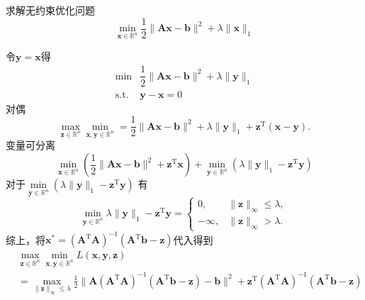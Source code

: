\begin{example}
    求解无约束优化问题
    \[
        \min_{\boldsymbol{x}\in\mathbb{R}^n}\frac12\|\boldsymbol{A}\boldsymbol{x}-\boldsymbol{b}\|^2+\lambda\|\boldsymbol{x}\|_1
    \]
    \begin{solution}
        令$\boldsymbol{y} = \boldsymbol{x}$得
        \[
            \begin{array}{rl}
                \min&\dfrac{1}{2}\|\boldsymbol{A}\boldsymbol{x}-\boldsymbol{b}\|^2+\lambda\|\boldsymbol{y}\|_1\\
                \mathrm{s.t.}&\boldsymbol{y}-\boldsymbol{x}=0
            \end{array}
        \]
        对偶
        \[
            \max_{\boldsymbol{z}\in\mathbb{R}^n}\min_{\boldsymbol{x},\boldsymbol{y}\in\mathbb{R}^n} =\frac12\|\boldsymbol{A}\boldsymbol{x}-\boldsymbol{b}\|^2+\lambda\|\boldsymbol{y}\|_1+\boldsymbol{z}^{\mathrm{T}}(\boldsymbol{x}-\boldsymbol{y}).
        \]
        变量可分离
        \[
            \boxed{\min_{\boldsymbol{x}\in\mathbb{R}^n}\left(\frac12\|\boldsymbol{Ax}-\boldsymbol{b}\|^2+\boldsymbol{z}^{\mathrm{T}} \boldsymbol{x}\right)} + \boxed{\min_{\boldsymbol{y}\in\mathbb{R}^n}\left(\lambda\|\boldsymbol{y}\|_1-\boldsymbol{z}^{\mathrm{T}} \boldsymbol{y}\right)}
        \]
        对于$\min\limits_{\boldsymbol{y}\in\mathbb{R}^n}\left(\lambda\|\boldsymbol{y}\|_1-\boldsymbol{z}^{\mathrm{T}} \boldsymbol{y}\right)$
        有
        \[
            \min_{\boldsymbol{y}\in\mathbb{R}^n}\lambda\|\boldsymbol{y}\|_1-\boldsymbol{z}^{\mathrm{T}}\boldsymbol{y}=
            \begin{cases}
                0,& \|\boldsymbol{z}\|_\infty\leqslant\lambda,\\
                -\infty,& \|\boldsymbol{z}\|_\infty>\lambda.
            \end{cases}
        \]
        综上，将$\boldsymbol{x}^* = \left( \boldsymbol{A}^{\mathrm{T}}\boldsymbol{A} \right)^{-1}(\boldsymbol{A}^{\mathrm{T}}\boldsymbol{b}-\boldsymbol{z})$代入得到
        \[
            \begin{aligned}
                &\max_{\boldsymbol{z}\in\mathbb{R}^n}\min_{\boldsymbol{x},\boldsymbol{y}\in\mathbb{R}^n}L(\boldsymbol{x},\boldsymbol{y},\boldsymbol{z})\\
                &=\max_{\|\boldsymbol{z}\|_\infty\leqslant\lambda}\frac12\|\boldsymbol{A}(\boldsymbol{A}^{\mathrm{T}}\boldsymbol{A})^{-1}(\boldsymbol{A}^{\mathrm{T}}\boldsymbol{b}-\boldsymbol{z})-\boldsymbol{b}\|^2+\boldsymbol{z}^{\mathrm{T}}(\boldsymbol{A}^{\mathrm{T}}\boldsymbol{A})^{-1}(\boldsymbol{A}^{\mathrm{T}}\boldsymbol{b}-\boldsymbol{z})\\

\end{aligned}\]
\end{solution}
\end{example}
